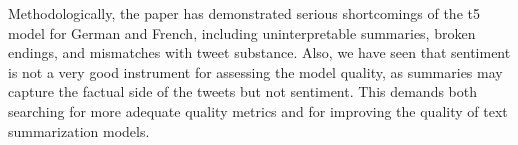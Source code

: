 Methodologically, the paper has demonstrated serious shortcomings of the t5 model for German and French, including uninterpretable summaries, broken endings, and mismatches with tweet substance. Also, we have seen that sentiment is not a very good instrument for assessing the model quality, as summaries may capture the factual side of the tweets but not sentiment. This demands both searching for more adequate quality metrics and for improving the quality of text summarization models.

\FloatBarrier

